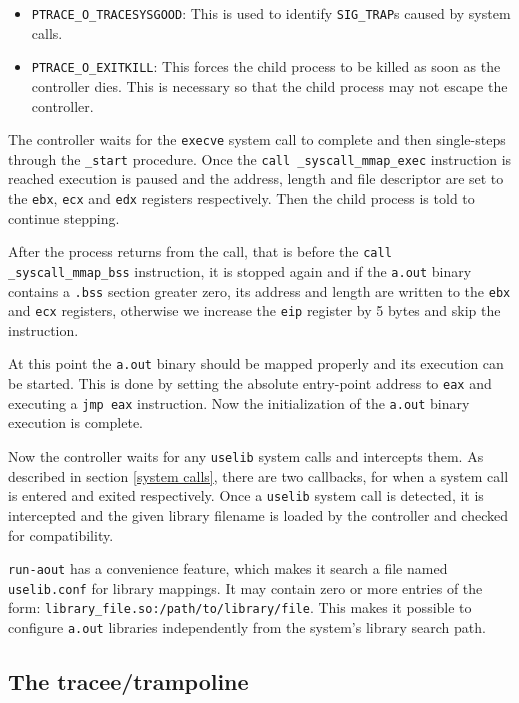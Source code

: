 \documentclass{article}
\begin{document}
\begin{itemize}
    \item \texttt{PTRACE\_O\_TRACESYSGOOD}: This is used to identify \texttt{SIG\_TRAP}s caused by system calls.
    \item \texttt{PTRACE\_O\_EXITKILL}: This forces the child process to be killed as soon as the controller dies. This is necessary so that the child process may not escape the controller.
\end{itemize}

The controller waits for the \texttt{execve} system call to complete and then single-steps through the \texttt{\_start} procedure. Once the \texttt{call \_syscall\_mmap\_exec} instruction is reached execution is paused and the address, length and file descriptor are set to the \texttt{ebx}, \texttt{ecx} and \texttt{edx} registers respectively. Then the child process is told to continue stepping.

After the process returns from the call, that is before the \texttt{call \_syscall\_mmap\_bss} instruction, it is stopped again and if the \texttt{a.out} binary contains a \texttt{.bss} section greater zero, its address and length are written to the \texttt{ebx} and \texttt{ecx} registers, otherwise we increase the \texttt{eip} register by 5 bytes and skip the instruction.

At this point the \texttt{a.out} binary should be mapped properly and its execution can be started. This is done by setting the absolute entry-point address to \texttt{eax} and executing a \texttt{jmp eax} instruction. Now the initialization of the \texttt{a.out} binary execution is complete.

Now the controller waits for any \texttt{uselib} system calls and intercepts them. As described in section \ref{system calls}, there are two callbacks, for when a system call is entered and exited respectively. Once a \texttt{uselib} system call is detected, it is intercepted and the given library filename is loaded by the controller and checked for compatibility.

\texttt{run-aout} has a convenience feature, which makes it search a file named \texttt{uselib.conf} for library mappings. It may contain zero or more entries of the form: \texttt{library\_file.so:/path/to/library/file}. This makes it possible to configure \texttt{a.out} libraries independently from the system's library search path.

\subsection{The tracee/trampoline}
\end{document}
